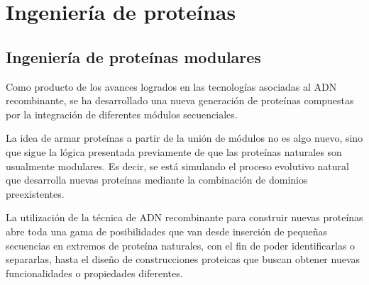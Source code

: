 %             
       
\section{Ingeniería de proteínas}\label{proteinEngineering}
\subsection{Ingeniería de proteínas modulares}    

Como producto de los avances logrados en las tecnologías asociadas al ADN recombinante, se ha desarrollado una nueva generación de proteínas compuestas por la integración
de diferentes módulos secuenciales.

La idea de armar proteínas a partir de la unión de módulos no es algo nuevo, sino que sigue la lógica presentada previamente de que las proteínas naturales son usualmente modulares. 
Es decir, se está simulando el proceso evolutivo natural que desarrolla nuevas proteínas mediante la combinación de dominios preexistentes.

La utilización de la técnica de ADN recombinante para construir nuevas proteínas abre toda una gama de posibilidades que van desde inserción de pequeñas secuencias en extremos de proteína naturales, 
con el fin de poder identificarlas o separarlas, hasta el diseño de construcciones proteicas que buscan obtener nuevas funcionalidades o propiedades diferentes.


